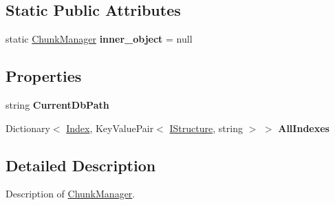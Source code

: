 \subsection*{Static Public Attributes}
\begin{DoxyCompactItemize}
\item 
\hypertarget{class_dwarf_d_b_1_1_chunk_manager_1_1_chunk_manager_a43d4aebedbb50fdfeb27840b3aa4849b}{
static \hyperlink{class_dwarf_d_b_1_1_chunk_manager_1_1_chunk_manager}{ChunkManager} {\bfseries inner\_\-object} = null}
\label{class_dwarf_d_b_1_1_chunk_manager_1_1_chunk_manager_a43d4aebedbb50fdfeb27840b3aa4849b}

\end{DoxyCompactItemize}
\subsection*{Properties}
\begin{DoxyCompactItemize}
\item 
\hypertarget{class_dwarf_d_b_1_1_chunk_manager_1_1_chunk_manager_ab3d1c419f8c1c396ca43368f5f214614}{
string {\bfseries CurrentDbPath}}
\label{class_dwarf_d_b_1_1_chunk_manager_1_1_chunk_manager_ab3d1c419f8c1c396ca43368f5f214614}

\item 
\hypertarget{class_dwarf_d_b_1_1_chunk_manager_1_1_chunk_manager_a9adc3ce8d62f6341303c48e8dae3cc17}{
Dictionary$<$ \hyperlink{class_dwarf_d_b_1_1_data_structures_1_1_index}{Index}, KeyValuePair$<$ \hyperlink{interface_dwarf_d_b_1_1_data_structures_1_1_i_structure}{IStructure}, string $>$ $>$ {\bfseries AllIndexes}}
\label{class_dwarf_d_b_1_1_chunk_manager_1_1_chunk_manager_a9adc3ce8d62f6341303c48e8dae3cc17}

\end{DoxyCompactItemize}


\subsection{Detailed Description}
Description of \hyperlink{class_dwarf_d_b_1_1_chunk_manager_1_1_chunk_manager}{ChunkManager}. 

